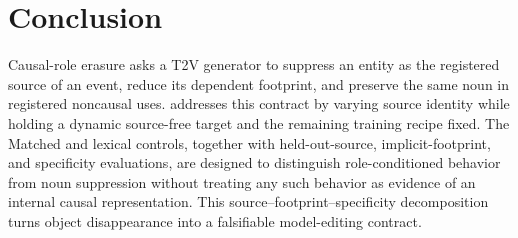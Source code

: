 \section{Conclusion}
\label{sec:conclusion}

Causal-role erasure asks a T2V generator to suppress an entity as the
registered source of an event, reduce its dependent footprint, and preserve
the same noun in registered noncausal uses.  \methodshort{} addresses this
contract by varying source identity while holding a dynamic source-free target
and the remaining training recipe fixed.  The Matched and lexical controls,
together with held-out-source, implicit-footprint, and specificity evaluations,
are designed to distinguish role-conditioned behavior from noun suppression
without treating any such behavior as evidence of an internal causal
representation.  This source--footprint--specificity decomposition turns
object disappearance into a falsifiable model-editing contract.

